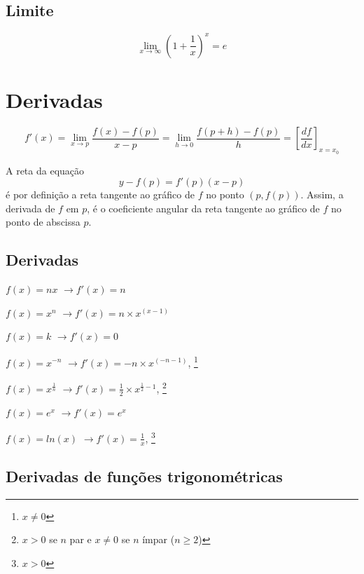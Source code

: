 \documentclass[11pt]{article}
\newcommand{\limit}[3]{{
  \underset{#1 \rightarrow #2}{\lim} #3
}}
\begin{document}
\subsection{Limite}

$$
\limit{x}{\infty}{(1+\frac{1}{x})^x} = e
$$

\section{Derivadas}

$$
f'(x) = \limit{x}{p}{ \frac{f(x) - f(p)}{x-p} =
  \limit{h}{0}{ \frac{f(p+h)- f(p)}{h} } } =
  [\frac{df}{dx}]_{x = x_0}
$$

A reta da equação $$y-f(p)=f'(p)(x-p)$$ é por definição a reta tangente ao
gráfico de $f$ no ponto $(p, f(p))$. Assim, a derivada de $f$ em $p$, é o
coeficiente angular da reta tangente ao gráfico de $f$ no ponto de abscissa
$p$.

\subsection{Derivadas}

\begin{description}
  \begin{multicols}{2}
    \item[ $f(x) = nx$ ]       $ \to f'(x) = n $
    \item[ $f(x) = x^n$ ]      $ \to f'(x) = n\times x^{(x-1)}$
    \item[ $f(x) = k$ ]        $ \to f'(x) = 0$
    \item[ $f(x) = x^{-n}$ ]   $ \to f'(x) = -n\times x^{(-n-1)} $,
      \footnote{$x\neq 0$}
    \item[ $f(x) = x^{ \frac{1}{n} }$ ] $ \to f'(x) = \frac{1}{2} \times
      x^{\frac{1}{2}-1}$,
      \footnote{$x>0$ se $n$ par e $x\neq 0$ se $n$ ímpar ($n\geq2$)}
    \item[ $f(x) = e^x$ ]      $ \to f'(x) = e^x $
    \item[ $f(x) = ln(x)$ ]    $ \to f'(x) = \frac{1}{x}$,
      \footnote{$x>0$}
    \end{multicols}
\end{description}

\subsection{Derivadas de funções trigonométricas}
\end{document}
